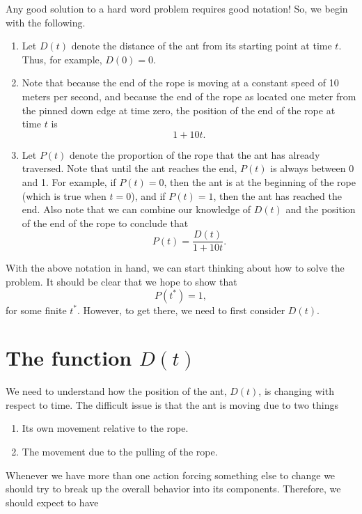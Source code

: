 \bigskip

Any good solution to a hard word problem requires good notation!  So,
we begin with the following.
\begin{enumerate}
\item Let $D(t)$ denote the distance of the ant from its starting
  point at time $t$.  Thus, for example, $D(0) = 0$.
\item Note that because the end of the rope is moving at a constant
  speed of 10 meters per second, and because the end of the rope as
  located one meter from the pinned down edge at time zero, the
  position of the end of the rope at time $t$ is
  \[
  1 + 10t.
  \]
\item Let $P(t)$ denote the proportion of the rope that the ant has
  already traversed.  Note that until the ant reaches the end, $P(t)$
  is always between 0 and 1.  For example, if $P(t) = 0$, then the ant
  is at the beginning of the rope (which is true when $t=0$), and if
  $P(t) = 1$, then the ant has reached the end.  Also note that we can
  combine our knowledge of $D(t)$ and the position of the end of the
  rope to conclude that
  \[
  P(t) = \frac{D(t)}{1 + 10 t}.
  \]
\end{enumerate}

With the above notation in hand, we can start thinking about how to
solve the problem.  It should be clear that we hope to show that
\[
P(t^*) = 1,
\]
for some finite $t^*$.  However, to get there, we need to first
consider $D(t)$.

\section{The function $D(t)$}

We need to understand how the position of the ant, $D(t)$, is changing
with respect to time. %
%
%
The difficult issue is that the ant is moving due to two things
\begin{enumerate}
\item Its own movement relative to the rope.
\item The movement due to the pulling of the rope.
\end{enumerate}

Whenever we have more than one action forcing something else to change
we should try to break up the overall behavior into its components.
Therefore, we should expect to have

